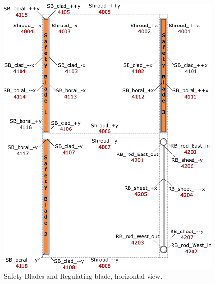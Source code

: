 \documentclass{UWNR_modeling}
\begin{document}
\begin{figure}[H]
  \centering
  \includegraphics[width=7in]{SBRB_xy.pdf}
  \caption{Safety Blades and Regulating blade, horizontal view.}
  \label{fig:SBRB_xy}
\end{figure}
\end{document}
